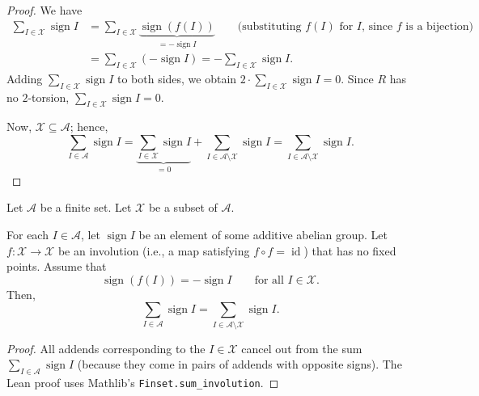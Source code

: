 \begin{proof}
We have
\begin{align*}
\sum_{I \in \mathcal{X}} \operatorname{sign} I
&= \sum_{I \in \mathcal{X}} \underbrace{\operatorname{sign}(f(I))}_{
= -\operatorname{sign} I}
\qquad \text{(substituting $f(I)$ for $I$, since $f$ is a bijection)} \\
&= \sum_{I \in \mathcal{X}} (-\operatorname{sign} I)
= -\sum_{I \in \mathcal{X}} \operatorname{sign} I.
\end{align*}
Adding $\sum_{I \in \mathcal{X}} \operatorname{sign} I$ to both sides,
we obtain $2 \cdot \sum_{I \in \mathcal{X}} \operatorname{sign} I = 0$.
Since $R$ has no $2$-torsion, $\sum_{I \in \mathcal{X}} \operatorname{sign} I = 0$.

Now, $\mathcal{X} \subseteq \mathcal{A}$; hence,
\[
\sum_{I \in \mathcal{A}} \operatorname{sign} I
= \underbrace{\sum_{I \in \mathcal{X}} \operatorname{sign} I}_{= 0}
+ \sum_{I \in \mathcal{A} \setminus \mathcal{X}} \operatorname{sign} I
= \sum_{I \in \mathcal{A} \setminus \mathcal{X}} \operatorname{sign} I.
\]
\end{proof}

\begin{lemma}
\label{lem.sign.cancel2}
\leantarget
\leanok
Let $\mathcal{A}$ be a finite set. Let $\mathcal{X}$ be a subset of
$\mathcal{A}$.

For each $I \in \mathcal{A}$, let $\operatorname{sign} I$ be an element
of some additive abelian group. Let
$f : \mathcal{X} \to \mathcal{X}$ be an involution (i.e., a map
satisfying $f \circ f = \operatorname{id}$) that has no fixed points.
Assume that
\[
\operatorname{sign}(f(I)) = -\operatorname{sign} I
\qquad \text{for all } I \in \mathcal{X}.
\]
Then,
\[
\sum_{I \in \mathcal{A}} \operatorname{sign} I
= \sum_{I \in \mathcal{A} \setminus \mathcal{X}} \operatorname{sign} I.
\]
\end{lemma}

\begin{proof}
All addends corresponding to the $I \in \mathcal{X}$ cancel out from
the sum $\sum_{I \in \mathcal{A}} \operatorname{sign} I$ (because they
come in pairs of addends with opposite signs). The Lean proof uses
Mathlib's \texttt{Finset.sum\_involution}.
\end{proof}

